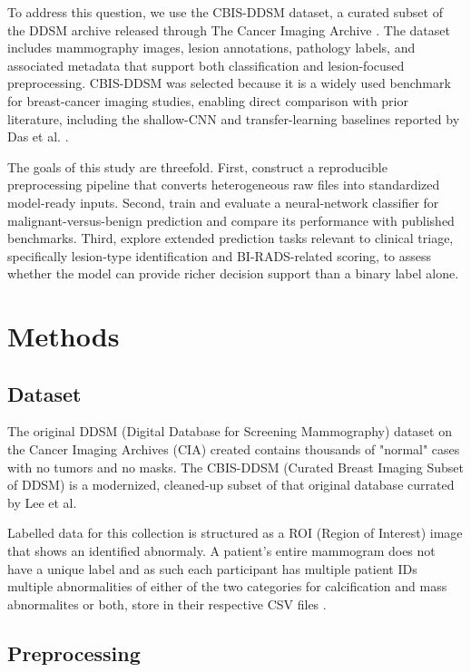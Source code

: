 \documentclass[12pt]{article}
\begin{document}
\medskip \noindent
To address this question, we use the CBIS-DDSM dataset, a curated subset of the DDSM archive released through The Cancer Imaging Archive \cite{ref:example1}. The dataset includes mammography images, lesion annotations, pathology labels, and associated metadata that support both classification and lesion-focused preprocessing. CBIS-DDSM was selected because it is a widely used benchmark for breast-cancer imaging studies, enabling direct comparison with prior literature, including the shallow-CNN and transfer-learning baselines reported by Das et al. \cite{ref:example2}.

\medskip \noindent
The goals of this study are threefold. First, construct a reproducible preprocessing pipeline that converts heterogeneous raw files into standardized model-ready inputs. Second, train and evaluate a neural-network classifier for malignant-versus-benign prediction and compare its performance with published benchmarks. Third, explore extended prediction tasks relevant to clinical triage, specifically lesion-type identification and BI-RADS-related scoring, to assess whether the model can provide richer decision support than a binary label alone.




\section{Methods}

\subsection{Dataset}
The original DDSM (Digital Database for Screening Mammography) dataset on the Cancer Imaging Archives (CIA) created contains thousands of "normal" cases with no tumors and no masks. The CBIS-DDSM (Curated Breast Imaging Subset of DDSM) is a modernized, cleaned-up subset of that original database currated by Lee et al. \cite{ref:example1} 

\medskip
\noindent
Labelled data for this collection is structured as a ROI (Region of Interest) image that shows an identified abnormaly. A patient's entire mammogram does not have a unique label and as such each participant has multiple patient IDs multiple abnormalities of either of the two categories for calcification and mass abnormalites or both, store in their respective CSV files \cite{ref:example1}.

\subsection{Preprocessing}
\end{document}

